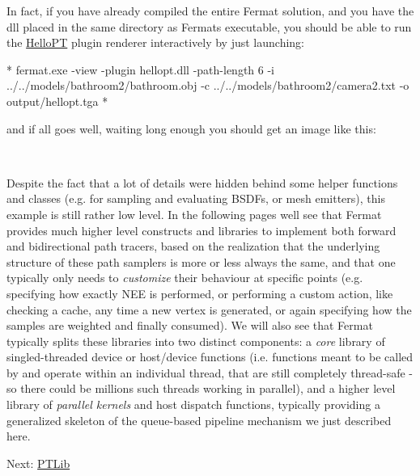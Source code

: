 \begin{DoxyParagraph}{}
In fact, if you have already compiled the entire Fermat solution, and you have the dll placed in the same directory as Fermat\textquotesingle{}s executable, you should be able to run the \hyperlink{struct_hello_p_t}{Hello\+PT} plugin renderer interactively by just launching\+: ~\newline
\begin{DoxyVerb}*  fermat.exe -view -plugin hellopt.dll -path-length 6 -i ../../models/bathroom2/bathroom.obj -c ../../models/bathroom2/camera2.txt -o output/hellopt.tga
* \end{DoxyVerb}
 
\end{DoxyParagraph}
\begin{DoxyParagraph}{}
and if all goes well, waiting long enough you should get an image like this\+:
\end{DoxyParagraph}


~\newline
 \begin{DoxyParagraph}{}
Despite the fact that a lot of details were hidden behind some helper functions and classes (e.\+g. for sampling and evaluating B\+S\+D\+Fs, or mesh emitters), this example is still rather low level. In the following pages we\textquotesingle{}ll see that Fermat provides much higher level constructs and libraries to implement both forward and bidirectional path tracers, based on the realization that the underlying structure of these path samplers is more or less always the same, and that one typically only needs to {\itshape customize} their behaviour at specific points (e.\+g. specifying how exactly N\+EE is performed, or performing a custom action, like checking a cache, any time a new vertex is generated, or again specifying how the samples are weighted and finally consumed). We will also see that Fermat typically splits these libraries into two distinct components\+: a {\itshape core} library of singled-\/threaded device or host/device functions (i.\+e. functions meant to be called by and operate within an individual thread, that are still completely thread-\/safe -\/ so there could be millions such threads working in parallel), and a higher level library of {\itshape parallel kernels} and host dispatch functions, typically providing a generalized skeleton of the queue-\/based pipeline mechanism we just described here.
\end{DoxyParagraph}
Next\+: \hyperlink{_p_t_lib_page}{P\+T\+Lib} 